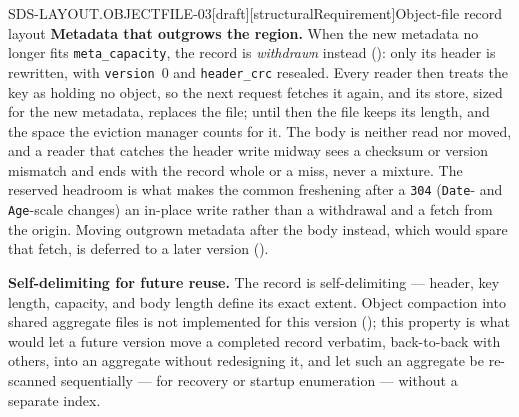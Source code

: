 \begin{requirement}{SDS-LAYOUT.OBJECTFILE-03}[draft][structuralRequirement]{Object-file record layout}
  \textbf{Metadata that outgrows the region.} When the new metadata no
  longer fits \texttt{meta\_capacity}, the record is \emph{withdrawn}
  instead (): only its header is
  rewritten, with \texttt{version}~0 and \texttt{header\_crc} resealed.
  Every reader then treats the key as holding no object, so the next request
  fetches it again, and its store, sized for the new metadata, replaces the
  file; until then the file keeps its length, and the space the eviction
  manager counts for it. The body is neither read nor moved, and a reader
  that catches the header write midway sees a checksum or version mismatch
  and ends with the record whole or a miss, never a mixture. The reserved
  headroom is what makes the common freshening after a \texttt{304}
  (\texttt{Date}- and \texttt{Age}-scale changes) an in-place write rather
  than a withdrawal and a fetch from the origin. Moving outgrown metadata
  after the body instead, which would spare that fetch, is deferred to a
  later version ().

  \textbf{Self-delimiting for future reuse.} The record is self-delimiting ---
  header, key length, capacity, and body length define its exact extent.
  Object compaction into shared aggregate files is not implemented for this
  version (); this property is what
  would let a future version move a completed record verbatim, back-to-back
  with others, into an aggregate without redesigning it, and let such an
  aggregate be re-scanned sequentially --- for recovery or startup
  enumeration --- without a separate index.


\end{requirement}
